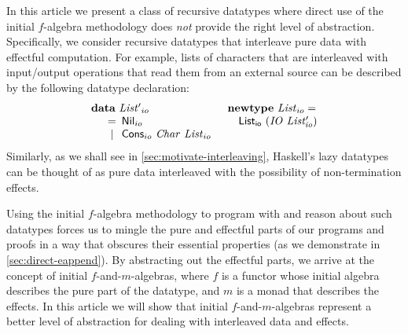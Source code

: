 \documentclass{jfp1}
\newcommand{\kw}[1]{\textbf{#1}}
\begin{document}
In this article we present a class of recursive datatypes where direct
use of the initial $f$-algebra methodology does \emph{not} provide the
right level of abstraction. Specifically, we consider recursive
datatypes that interleave pure data with effectful computation. For
example, lists of characters that are interleaved with input/output
operations that read them from an external source can be described by
the following datatype declaration:
\begin{displaymath}\label{defn:listio}
  \begin{array}{ll}
    \kw{data}~\mathit{List'}_{io}
    &
    \kw{newtype}~\mathit{List}_{io} = 
    \\
    \quad
    \begin{array}[t]{c@{\hspace{0.5em}}l}
      = & \mathsf{Nil}_{io} \\
      | & \mathsf{Cons}_{io}~\mathit{Char}~\mathit{List}_{io} \\
    \end{array}
    &
    \quad \mathsf{List_{io}}~(\mathit{IO}~\mathit{List'_{io}})
  \end{array}
\end{displaymath}
Similarly, as we shall see in \autoref{sec:motivate-interleaving},
Haskell's lazy datatypes can be thought of as pure data interleaved
with the possibility of non-termination effects.

Using the initial $f$-algebra methodology to program with and reason
about such datatypes forces us to mingle the pure and effectful parts
of our programs and proofs in a way that obscures their essential
properties (as we demonstrate in \autoref{sec:direct-eappend}). By
abstracting out the effectful parts, we arrive at the concept of
initial $f$-and-$m$-algebras, where $f$ is a functor whose initial
algebra describes the pure part of the datatype, and $m$ is a monad
that describes the effects. In this article we will show that initial
$f$-and-$m$-algebras represent a better level of abstraction for
dealing with interleaved data and effects.
\end{document}
